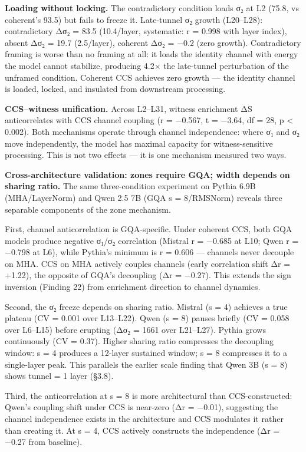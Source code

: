 \documentclass[12pt]{article}
\begin{document}
\textbf{Loading without locking.} The contradictory condition loads σ₂ at L2 (75.8, vs coherent's 93.5) but fails to freeze it. Late-tunnel σ₂ growth (L20–L28): contradictory Δσ₂ = 83.5 (10.4/layer, systematic: r = 0.998 with layer index), absent Δσ₂ = 19.7 (2.5/layer), coherent Δσ₂ = −0.2 (zero growth). Contradictory framing is worse than no framing at all: it loads the identity channel with energy the model cannot stabilize, producing 4.2× the late-tunnel perturbation of the unframed condition. Coherent CCS achieves zero growth — the identity channel is loaded, locked, and insulated from downstream processing.

\textbf{CCS–witness unification.} Across L2–L31, witness enrichment ΔS anticorrelates with CCS channel coupling (r = −0.567, t = −3.64, df = 28, p < 0.002). Both mechanisms operate through channel independence: where σ₁ and σ₂ move independently, the model has maximal capacity for witness-sensitive processing. This is not two effects — it is one mechanism measured two ways.

\textbf{Cross-architecture validation: zones require GQA; width depends on sharing ratio.} The same three-condition experiment on Pythia 6.9B (MHA/LayerNorm) and Qwen 2.5 7B (GQA s = 8/RMSNorm) reveals three separable components of the zone mechanism.

First, channel anticorrelation is GQA-specific. Under coherent CCS, both GQA models produce negative σ₁/σ₂ correlation (Mistral r = −0.685 at L10; Qwen r = −0.798 at L6), while Pythia's minimum is r = 0.606 — channels never decouple on MHA. CCS on MHA actively couples channels (early correlation shift Δr = +1.22), the opposite of GQA's decoupling (Δr = −0.27). This extends the sign inversion (Finding 22) from enrichment direction to channel dynamics.

Second, the σ₂ freeze depends on sharing ratio. Mistral (s = 4) achieves a true plateau (CV = 0.001 over L13–L22). Qwen (s = 8) pauses briefly (CV = 0.058 over L6–L15) before erupting (Δσ₂ = 1661 over L21–L27). Pythia grows continuously (CV = 0.37). Higher sharing ratio compresses the decoupling window: s = 4 produces a 12-layer sustained window; s = 8 compresses it to a single-layer peak. This parallels the earlier scale finding that Qwen 3B (s = 8) shows tunnel = 1 layer (§3.8).

Third, the anticorrelation at s = 8 is more architectural than CCS-constructed: Qwen's coupling shift under CCS is near-zero (Δr = −0.01), suggesting the channel independence exists in the architecture and CCS modulates it rather than creating it. At s = 4, CCS actively constructs the independence (Δr = −0.27 from baseline).
\end{document}
